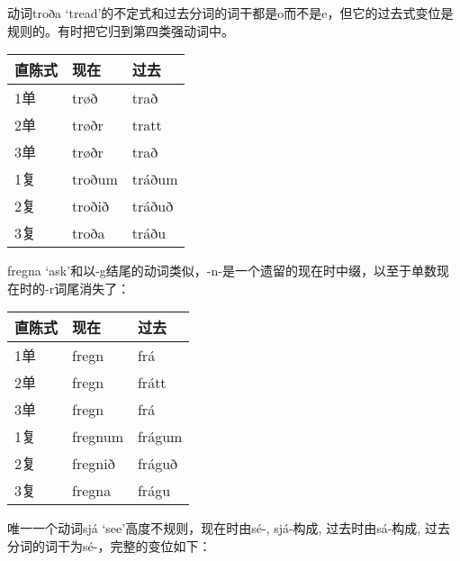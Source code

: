 动词troða
`tread‌'的不定式和过去分词的词干都是o而不是e，但它的过去式变位是规则的。有时把它归到第四类强动词中。

\begin{longtable}{lll}
  \toprule
  直陈式 & 现在     & 过去     \\
  \midrule
  \endhead
  \bottomrule
  \endfoot
  1单  & trøð   & trað   \\
  2单  & trøðr  & tratt  \\
  3单  & trøðr  & trað   \\
  1复  & troðum & tráðum \\
  2复  & troðið & tráðuð \\
  3复  & troða  & tráðu  \\
\end{longtable}

fregna
`ask'和以-g结尾的动词类似，-n-是一个遗留的现在时中缀，以至于单数现在时的-r词尾消失了：

\begin{longtable}{lll}
  \toprule
  直陈式 & 现在      & 过去     \\
  \midrule
  \endhead
  \bottomrule
  \endfoot
  1单  & fregn   & frá    \\
  2单  & fregn   & frátt  \\
  3单  & fregn   & frá    \\
  1复  & fregnum & frágum \\
  2复  & fregnið & fráguð \\
  3复  & fregna  & frágu  \\
\end{longtable}

唯一一个动词sjá `see‌'高度不规则，现在时由sé-, sjá-构成, 过去时由sá-构成,
过去分词的词干为sé-，完整的变位如下：

